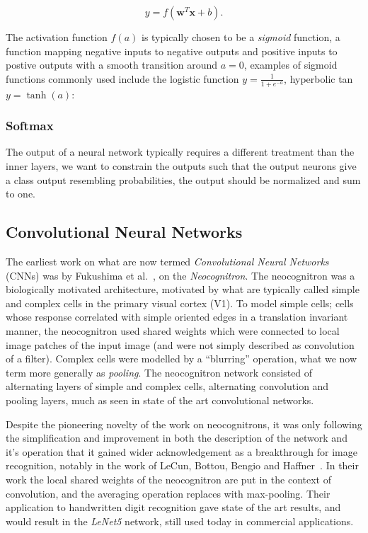 \documentclass[thesis]{subfiles}
\begin{document}
\begin{equation}
    y = f(\mathbf{w}^T\mathbf{x} + b).
\end{equation}

The activation function $f(a)$ is typically chosen to be a \emph{sigmoid} function, \ie a function mapping negative inputs to negative outputs and positive inputs to postive outputs with a smooth transition around $a = 0$, examples of sigmoid functions commonly used include the logistic function $y = \frac{1}{1+e^{-a}}$, hyperbolic tan $y = \tanh(a)$:

\subsubsection{Softmax}
The output of a neural network typically requires a different treatment than the inner layers, we want to constrain the outputs such that the output neurons give a class output resembling probabilities, \ie the output should be normalized and sum to one. 

\subsection{Convolutional Neural Networks}
The earliest work on what are now termed \emph{Convolutional Neural Networks} (CNNs) was by Fukushima et al.~\cite{Fuk80,fukushima2013artificial}, on the \emph{Neocognitron}. The neocognitron was a biologically motivated architecture, motivated by what are typically called simple and complex cells in the primary visual cortex (V1). To model simple cells; cells whose response correlated with simple oriented edges in a translation invariant manner, the neocognitron used shared weights which were connected to local image patches of the input image (and were not simply described as convolution of a filter). Complex cells were modelled by a ``blurring'' operation, what we now term more generally as \emph{pooling}. The neocognitron network consisted of alternating layers of simple and complex cells, \ie alternating convolution and pooling layers, much as seen in state of the art convolutional networks.

Despite the pioneering novelty of the work on neocognitrons, it was only following the simplification and improvement in both the description of the network and it's operation that it gained wider acknowledgement as a breakthrough for image recognition, notably in the work of LeCun, Bottou, Bengio and Haffner~\cite{Lecun1998}. In their work the local shared weights of the neocognitron are put in the context of convolution, and the averaging operation replaces with max-pooling. Their application to handwritten digit recognition gave state of the art results, and would result in the \emph{LeNet5} network, still used today in commercial applications. 
\end{document}
